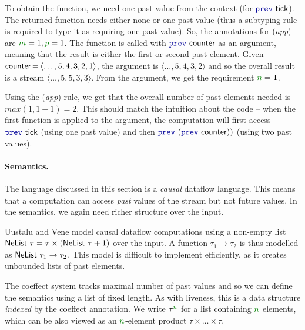 To obtain the function, we need one past value from the context (for $\kvd{prev}~\ident{tick}$). The
returned function needs either none or one past value (thus a subtyping rule is required to type
it as requiring one past value). So, the annotations for (\emph{app}) are $\cclrd{m}=1, \cclrd{p}=1$.
The function is called with $\kvd{prev}~\ident{counter}$ as an argument, meaning that the result
is either the first or second past element. Given
$\textnormal{\sffamily counter}\hspace{-0.1em}=\hspace{-0.1em}\langle{\ldots,5,4,3,2,1}\rangle$, the argument
is $\langle{\ldots,5,4,3,2}\rangle$ and so the overall result is a stream $\langle{\ldots,5,5,3,3}\rangle$.
From the argument, we get the requirement $\cclrd{n}=1$.

Using the (\emph{app}) rule, we get that the overall number of past elements needed is
$\mathit{max}(1, 1+1) = 2$. This should match the intuition about the code -- when the first function
is applied to the argument, the computation will first access $\kvd{prev}~\ident{tick}$ (using one
past value) and then $\kvd{prev}~(\kvd{prev}~\ident{counter}))$ (using two past values).


\paragraph{Semantics.}
The language discussed in this section is a \emph{causal} dataflow language. This means that
a computation can access \emph{past} values of the stream but not future values. In the semantics,
we again need richer structure over the input.

Uustalu and Vene \cite{comonads-notions} model causal dataflow computations using a non-empty list
$\ident{NeList}~\tau = \tau \times (\ident{NeList}~\tau + 1)$ over the input. A function $\tau_1 \rightarrow \tau_2$
is thus modelled as $\textnormal{\sffamily NeList}~\tau_1 \rightarrow \tau_2$. This model is difficult to implement
efficiently, as it creates unbounded lists of past elements.

The coeffect system tracks maximal number of past values and so we can define the semantics using
a list of fixed length. As with liveness, this is a data structure \emph{indexed} by the coeffect
annotation. We write $\tau^{\cclrd{n}}$ for a list containing $\cclrd{n}$ elements, which can be
also viewed as an $\cclrd{n}$-element product $\tau \times \ldots \times \tau$.


